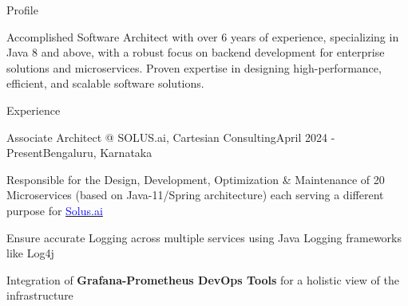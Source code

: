 \documentclass[
	a4paper, %
	12pt, %
]{resume} %
\begin{document}

\begin{rSection}{Profile}
	\item Accomplished Software Architect with over 6 years of experience, specializing in Java 8 and above, with a robust focus on backend development for enterprise solutions and microservices. Proven expertise in designing high-performance, efficient, and scalable software solutions. 
\end{rSection}
	
\begin{rSection}{Experience}
	\hspace{-2em}
	\begin{rSubsection}{Associate Architect @ SOLUS.ai, Cartesian Consulting}{April 2024 - Present}{}{Bengaluru, Karnataka}
		\item Responsible for the Design, Development, Optimization \& Maintenance of 20 Microservices (based on Java-11/Spring architecture) each serving a different purpose for \href{https://docs.solus.ai/docs/category/apis}{\textcolor{blue}{Solus.ai}}
		\item Ensure accurate Logging across multiple services using Java Logging frameworks like Log4j
		\item Integration of \textbf{Grafana-Prometheus DevOps Tools} for a holistic view of the infrastructure



\end{rSubsection}
\end{rSection}
\end{document}
